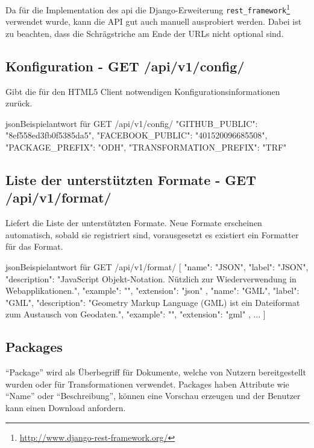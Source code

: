 Da für die Implementation des \gls{api} die Django-Erweiterung \texttt{rest\_framework}\footnote{\url{http://www.django-rest-framework.org/}} verwendet wurde, kann die API gut auch manuell ausprobiert werden. Dabei ist zu beachten, dass die Schrägstriche am Ende der URLs nicht optional sind.

\subsection{Konfiguration - GET /api/v1/config/}
Gibt die für den HTML5 Client notwendigen Konfigurationsinformationen zurück.

\begin{srclst}{json}{Beispielantwort für GET /api/v1/config/}
{
  "GITHUB_PUBLIC": "8ef558ed3fb0f5385da5", 
  "FACEBOOK_PUBLIC": "401520096685508", 
  "PACKAGE_PREFIX": "ODH", 
  "TRANSFORMATION_PREFIX": "TRF"
}
\end{srclst}

\subsection{Liste der unterstützten Formate - GET /api/v1/format/} \label{sec:pd:api-format}
Liefert die Liste der unterstützten Formate. Neue Formate erscheinen automatisch, sobald sie registriert sind, vorausgesetzt es existiert ein Formatter für das Format.

\begin{srclst}{json}{Beispielantwort für GET /api/v1/format/}
[
    {
        "name": "JSON", 
        "label": "JSON", 
        "description": "JavaScript Objekt-Notation. Nützlich zur Wiederverwendung in Webapplikationen.", 
        "example": "", 
        "extension": "json"
    }, 
    {
        "name": "GML", 
        "label": "GML", 
        "description": "Geometry Markup Language (GML) ist ein Dateiformat zum Austausch von Geodaten.", 
        "example": "", 
        "extension": "gml"
    }, 
    ...
]
\end{srclst}

\subsection{Packages}
``Package'' wird als Überbegriff für Dokumente, welche von Nutzern bereitgestellt wurden oder für Transformationen verwendet. Packages haben Attribute wie ``Name'' oder ``Beschreibung'', können eine Vorschau erzeugen und der Benutzer kann einen Download anfordern.

